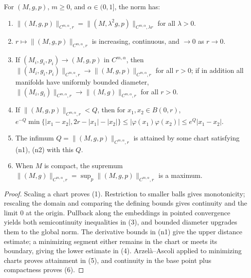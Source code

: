 \begin{proposition}
  \label{prop:pet-ch11-norm-properties}
  For $(M,g,p)$, $m\ge0$, and $\alpha\in(0,1]$, the norm has:
  \begin{enumerate}
  \item[(1)] $\|(M,g,p)\|_{C^{m,\alpha},r}=\|(M,\lambda^2g,p)\|_{C^{m,\alpha},\lambda r}$ for all $\lambda>0$.
  \item[(2)] $r\mapsto\|(M,g,p)\|_{C^{m,\alpha},r}$ is increasing, continuous, and $\to0$ as $r\to0$.
  \item[(3)] If $(M_i,g_i,p_i)\to(M,g,p)$ in $C^{m,\alpha}$, then
    $\|(M_i,g_i,p_i)\|_{C^{m,\alpha},r}\to\|(M,g,p)\|_{C^{m,\alpha},r}$ for all $r>0$;
    if in addition all manifolds have uniformly bounded diameter,
    $\|(M_i,g_i)\|_{C^{m,\alpha},r}\to\|(M,g)\|_{C^{m,\alpha},r}$ for all $r>0$.
  \item[(4)] If $\|(M,g,p)\|_{C^{m,\alpha},r}<Q$, then for $x_1,x_2\in B(0,r)$,
    $e^{-Q}\min\{|x_1-x_2|,2r-|x_1|-|x_2|\}\le|\varphi(x_1)\varphi(x_2)|\le e^Q|x_1-x_2|$.
  \item[(5)] The infimum $Q=\|(M,g,p)\|_{C^{m,\alpha},r}$ is attained by some
    chart satisfying (n1), (n2) with this $Q$.
  \item[(6)] When $M$ is compact, the supremum $\|(M,g)\|_{C^{m,\alpha},r}=\sup_p\|(M,g,p)\|_{C^{m,\alpha},r}$ is a maximum.
  \end{enumerate}
\end{proposition}
\begin{proof}
  \sketch
  Scaling a chart proves (1). Restriction to smaller balls gives monotonicity; rescaling the domain and comparing the defining bounds gives continuity and the limit \(0\) at the origin. Pullback along the embeddings in pointed convergence yields both semicontinuity inequalities in (3), and bounded diameter upgrades them to the global norm. The derivative bounds in (n1) give the upper distance estimate; a minimizing segment either remains in the chart or meets its boundary, giving the lower estimate in (4). Arzelà--Ascoli applied to minimizing charts proves attainment in (5), and continuity in the base point plus compactness proves (6).
\end{proof}


